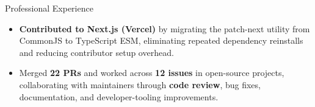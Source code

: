 \documentclass{resume}
\begin{document}
\begin{experienceSection}{Professional Experience}
\begin{itemize}
    \end{itemize}

    \experienceItem[
        company={Open Source Contributor | Remote},
        location={},
        position={},
        duration={July 2025 - May 2026}
    ]
    \begin{itemize}
        \itemsep -6pt {}
        \item \textbf{Contributed to Next.js (Vercel)} by migrating the patch-next utility from CommonJS to TypeScript ESM, eliminating repeated dependency reinstalls and reducing contributor setup overhead.
        \item Merged \textbf{22 PRs} and worked across \textbf{12 issues} in open-source projects, collaborating with maintainers through \textbf{code review}, bug fixes, documentation, and developer-tooling improvements.
    \end{itemize}
\end{experienceSection}
\end{document}
